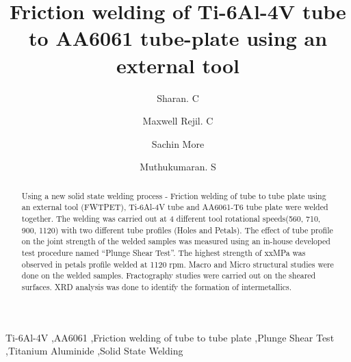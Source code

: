 \documentclass[3p]{elsarticle}
\begin{document}
\newcommand{\degree}{\ensuremath{^{\circ}}}  %

\begin{frontmatter}

\title{Friction welding of Ti-6Al-4V tube to AA6061 tube-plate using an external tool}

\author[META]{Sharan. C}
\author[META]{Maxwell Rejil. C}
\author[META]{Sachin More}
\author[META]{Muthukumaran. S}


\address[META]{Department of Metallurgical and Materials Engineering, National Institute of Technology, Tiruchirappalli-620015, India}
         
\begin{abstract}
Using a new solid state welding process - Friction welding of tube to tube plate using an external tool (FWTPET), Ti-6Al-4V tube and AA6061-T6 tube plate were welded together. The welding was carried out at 4 different tool rotational speeds(560, 710, 900, 1120) with two different tube profiles (Holes and Petals). The effect of tube profile on the joint strength of the welded samples was measured using an in-house developed test procedure named ``Plunge Shear Test''. The highest strength of xxMPa was observed in petals profile welded at 1120 rpm. Macro and Micro structural studies were done on the welded samples. Fractography studies were carried out on the sheared surfaces. XRD analysis was done to identify the formation of intermetallics.
\end{abstract}

\begin{keyword}
Ti-6Al-4V \sep AA6061 \sep Friction welding of tube to tube plate \sep Plunge Shear Test \sep Titanium Aluminide \sep  Solid State Welding
\end{keyword}

\end{frontmatter}

\end{document}
